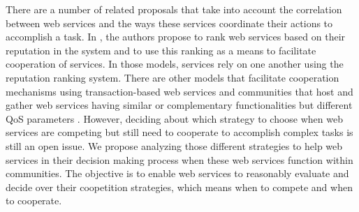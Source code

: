 \documentclass[runningheads,a4paper]{llncs}
\begin{document}
There are a number of related proposals that take into account the
correlation between web services and the ways these services
coordinate their actions to accomplish a task. In
\cite{Jurca,Jurca2,Kalepu,Malik,Maximilien1}, the authors propose
to rank web services based on their reputation in the system and
to use this ranking as a means to facilitate cooperation of
services. In those models, services rely on one another using the
reputation ranking system. There are other models that facilitate
cooperation mechanisms using transaction-based web services
\cite{Rosario} and communities that host and gather web services
having similar or complementary functionalities but different QoS
parameters
\cite{Khosravifar1}. %
However, deciding about which strategy to choose when web services
are competing but still need to cooperate to accomplish complex
tasks is still an open issue. We propose analyzing those different
strategies to help web services in their decision making process
when these
web services function within communities. %
The objective is to enable web services to reasonably evaluate and
decide over their coopetition strategies, which means when to
compete and when to cooperate.
\end{document}
